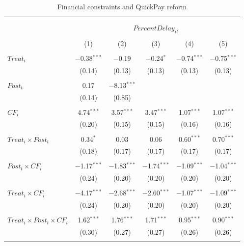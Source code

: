 \documentclass[
]{article}
\begin{document}
\begin{table}[H] \centering 
  \caption{Financial constraints and QuickPay reform} 
  \label{} 
\small 
\begin{tabular}{@{\extracolsep{-2pt}}lccccc} 
\\[-1.8ex]\hline 
\hline \\[-1.8ex] 
\\[-1.8ex] & \multicolumn{5}{c}{$PercentDelay_{it}$  } \\ 
\\[-1.8ex] & (1) & (2) & (3) & (4) & (5)\\ 
\hline \\[-1.8ex] 
 $Treat_i$ & $-$0.38$^{***}$ & $-$0.19 & $-$0.24$^{*}$ & $-$0.74$^{***}$ & $-$0.75$^{***}$ \\ 
  & (0.14) & (0.13) & (0.13) & (0.13) & (0.13) \\ 
  & & & & & \\ 
 $Post_t$ & 0.17 & $-$8.13$^{***}$ &  &  &  \\ 
  & (0.14) & (0.85) &  &  &  \\ 
  & & & & & \\ 
 $CF_i$ & 4.74$^{***}$ & 3.57$^{***}$ & 3.47$^{***}$ & 1.07$^{***}$ & 1.07$^{***}$ \\ 
  & (0.20) & (0.15) & (0.15) & (0.16) & (0.16) \\ 
  & & & & & \\ 
 $Treat_i \times Post_t$ & 0.34$^{*}$ & 0.03 & 0.06 & 0.60$^{***}$ & 0.70$^{***}$ \\ 
  & (0.18) & (0.17) & (0.17) & (0.17) & (0.17) \\ 
  & & & & & \\ 
 $Post_t \times CF_i$ & $-$1.17$^{***}$ & $-$1.83$^{***}$ & $-$1.74$^{***}$ & $-$1.09$^{***}$ & $-$1.04$^{***}$ \\ 
  & (0.24) & (0.20) & (0.20) & (0.20) & (0.20) \\ 
  & & & & & \\ 
 $Treat_i \times CF_i$ & $-$4.17$^{***}$ & $-$2.68$^{***}$ & $-$2.60$^{***}$ & $-$1.07$^{***}$ & $-$1.09$^{***}$ \\ 
  & (0.24) & (0.20) & (0.20) & (0.20) & (0.20) \\ 
  & & & & & \\ 
 $Treat_i \times Post_t \times CF_i$ & 1.62$^{***}$ & 1.76$^{***}$ & 1.71$^{***}$ & 0.95$^{***}$ & 0.90$^{***}$ \\ 
  & (0.30) & (0.27) & (0.27) & (0.26) & (0.26) \\ 
  & & & & & \\ 

\end{tabular}
\end{table}
\end{document}
